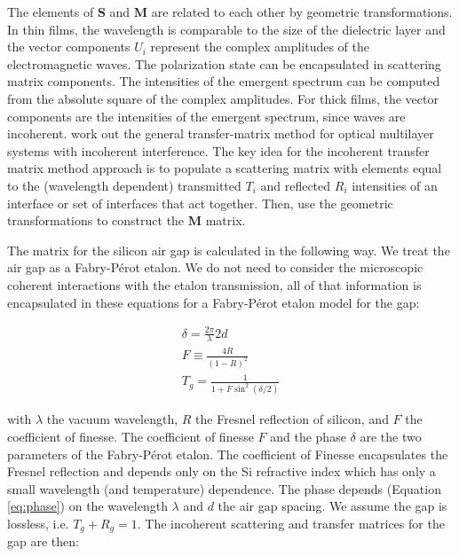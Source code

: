 \documentclass[osajnl,twocolumn,showpacs,superscriptaddress,11pt]{revtex4-1} %
\begin{document}
The elements of $\boldsymbol{S}$ and $\boldsymbol{M}$ are related to each other by geometric transformations\cite{2007fuph.book.....S}.  In thin films, the wavelength is comparable to the size of the dielectric layer and the vector components $U_{i}$ represent the complex amplitudes of the electromagnetic waves.  The polarization state can be encapsulated in scattering matrix components\cite{2007fuph.book.....S}.  The intensities of the emergent spectrum can be computed from the absolute square of the complex amplitudes.  For thick films, the vector components are the intensities of the emergent spectrum, since waves are incoherent.  \cite{2002ApOpt..41.3978K} work out the general transfer-matrix method for optical multilayer systems with incoherent interference.  The key idea for the incoherent transfer matrix method approach is to populate a scattering matrix with elements equal to the (wavelength dependent) transmitted $T_i$ and reflected $R_i$ intensities of an interface or set of interfaces that act together.  Then, use the geometric transformations to construct the $\boldsymbol{M}$ matrix.

The matrix for the silicon air gap is calculated in the following way.  We treat the air gap as a Fabry-P\'{e}rot etalon.  We do not need to consider the microscopic coherent interactions with the etalon transmission, all of that information is encapsulated in these equations for a Fabry-P\'{e}rot etalon model for the gap:

\begin{eqnarray}
 \delta = \frac{2\pi}{\lambda}2d \label{eq:phase} \\
  F \equiv \frac{4R}{(1-R)^2} \\
 T_g = \frac{1}{1+F\sin^2(\delta/2)}  \label{eq:FabPerot}
\end{eqnarray}

with $\lambda$ the vacuum wavelength, $R$ the Fresnel reflection of silicon, and $F$ the coefficient of finesse.  The coefficient of finesse $F$ and the phase $\delta$ are the two parameters of the Fabry-P\'{e}rot etalon.  The coefficient of Finesse encapsulates the Fresnel reflection and depends only on the Si refractive index which has only a small wavelength (and temperature) dependence.  The phase depends (Equation \ref{eq:phase}) on the wavelength $\lambda$ and $d$ the air gap spacing.  We assume the gap is lossless, i.e. $T_g+R_g=1$.  The incoherent scattering and transfer matrices for the gap are then:
\end{document}
